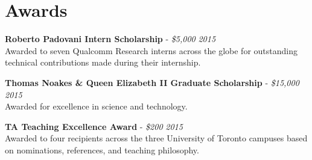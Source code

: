 \section{\sc Awards}

\textbf{Roberto Padovani Intern Scholarship} - {\em \$5,000} \hfill {\em 2015} \\
Awarded to seven Qualcomm Research interns across the globe for outstanding technical contributions made during their internship.

\textbf{Thomas Noakes \& Queen Elizabeth II Graduate Scholarship} - {\em \$15,000} \hfill {\em 2015} \\
Awarded for excellence in science and technology.

\textbf{TA Teaching Excellence Award} - {\em \$200} \hfill {\em 2015} \\
Awarded to four recipients across the three University of Toronto campuses based on nominations, references, and teaching philosophy.

